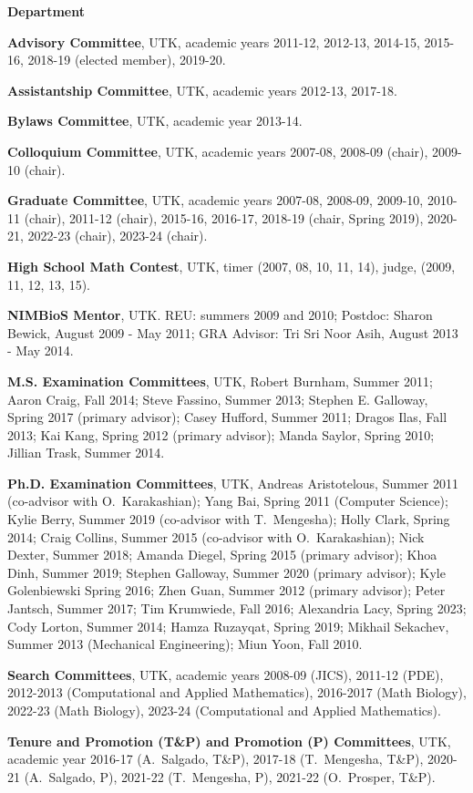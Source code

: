 \documentclass[11pt]{letter}
\begin{document}
\begin{description}
	\item
{\Large\bf Department}
    \begin{description}
    \item
\textbf{Advisory Committee}, UTK, academic years 2011-12, 2012-13, 2014-15, 2015-16, 2018-19 (elected member), 2019-20.
    \item
\textbf{Assistantship Committee}, UTK, academic years 2012-13, 2017-18.
    \item
\textbf{Bylaws Committee}, UTK, academic year 2013-14.
	\item
\textbf{Colloquium Committee}, UTK, academic years 2007-08, 2008-09 (chair), 2009-10 (chair).
    \item
\textbf{Graduate Committee}, UTK, academic years 2007-08, 2008-09, 2009-10, 2010-11 (chair), 2011-12 (chair), 2015-16, 2016-17, 2018-19 (chair, Spring 2019), 2020-21, 2022-23 (chair), 2023-24 (chair).
    \item
\textbf{High School Math Contest}, UTK, timer (2007, 08, 10, 11, 14), judge, (2009, 11, 12, 13, 15).
    \item
\textbf{NIMBioS Mentor}, UTK. REU: summers 2009 and 2010; Postdoc: Sharon Bewick, August 2009 - May 2011; GRA Advisor: Tri Sri Noor Asih, August 2013 - May 2014.
	\item
\textbf{M.S. Examination Committees}, UTK, Robert Burnham, Summer 2011; Aaron Craig, Fall 2014; Steve Fassino, Summer 2013; Stephen E. Galloway, Spring 2017 (primary advisor); Casey Hufford, Summer 2011; Dragos Ilas, Fall 2013; Kai Kang, Spring 2012 (primary advisor); Manda Saylor, Spring 2010; Jillian Trask, Summer 2014.
	\item
\textbf{Ph.D. Examination Committees}, UTK, Andreas Aristotelous, Summer 2011 (co-advisor with O.~Karakashian); Yang Bai, Spring 2011 (Computer Science); Kylie Berry, Summer 2019 (co-advisor with T.~Mengesha); Holly Clark,  Spring 2014; Craig Collins, Summer 2015 (co-advisor with O.~Karakashian); Nick Dexter, Summer 2018; Amanda Diegel, Spring 2015 (primary advisor); Khoa Dinh, Summer 2019; Stephen Galloway, Summer 2020 (primary advisor); Kyle Golenbiewski Spring 2016; Zhen Guan, Summer 2012 (primary advisor); Peter Jantsch, Summer 2017; Tim Krumwiede, Fall 2016; Alexandria Lacy, Spring 2023; Cody Lorton, Summer 2014; Hamza Ruzayqat, Spring 2019; Mikhail Sekachev, Summer 2013 (Mechanical Engineering); Miun Yoon, Fall 2010.
	\item
\textbf{Search Committees}, UTK, academic years 2008-09 (JICS), 2011-12 (PDE), 2012-2013 (Computational and Applied Mathematics), 2016-2017 (Math Biology), 2022-23 (Math Biology), 2023-24  (Computational and Applied Mathematics).
	\item
\textbf{Tenure and Promotion (T\&P) and Promotion (P) Committees}, UTK, academic year 2016-17 (A.~Salgado, T\&P), 2017-18 (T.~Mengesha, T\&P), 2020-21 (A.~Salgado, P), 2021-22 (T.~Mengesha, P), 2021-22 (O.~Prosper, T\&P).


\end{description}
\end{description}
\end{document}
